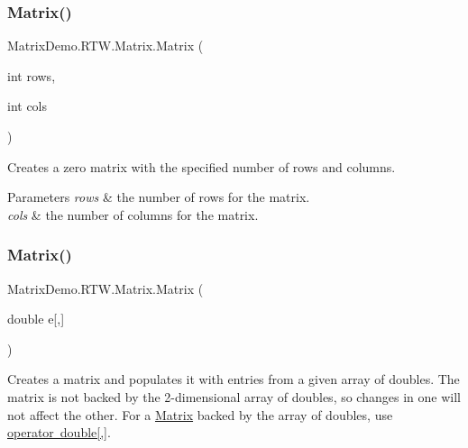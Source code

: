 \subsubsection{\texorpdfstring{Matrix()}{Matrix()}\hspace{0.1cm}{\footnotesize\ttfamily [1/2]}}
{\footnotesize\ttfamily Matrix\+Demo.\+R\+T\+W.\+Matrix.\+Matrix (\begin{DoxyParamCaption}\item[{int}]{rows,  }\item[{int}]{cols }\end{DoxyParamCaption})}



Creates a zero matrix with the specified number of rows and columns. 


\begin{DoxyParams}{Parameters}
{\em rows} & the number of rows for the matrix.\\
\hline
{\em cols} & the number of columns for the matrix.\\
\hline
\end{DoxyParams}
\mbox{\label{class_matrix_demo_1_1_r_t_w_1_1_matrix_ad2a320fd0c86551f34070679fd43433c}} 
\subsubsection{\texorpdfstring{Matrix()}{Matrix()}\hspace{0.1cm}{\footnotesize\ttfamily [2/2]}}
{\footnotesize\ttfamily Matrix\+Demo.\+R\+T\+W.\+Matrix.\+Matrix (\begin{DoxyParamCaption}\item[{double}]{e\mbox{[},\mbox{]} }\end{DoxyParamCaption})}



Creates a matrix and populates it with entries from a given array of doubles. The matrix is not backed by the 2-\/dimensional array of doubles, so changes in one will not affect the other. For a \mbox{\hyperlink{class_matrix_demo_1_1_r_t_w_1_1_matrix}{Matrix}} backed by the array of doubles, use \mbox{\hyperlink{class_matrix_demo_1_1_r_t_w_1_1_matrix_ac23641ac04b3c3baf14174bdf9049db2}{operator double\mbox{[},\mbox{]}}}. 



